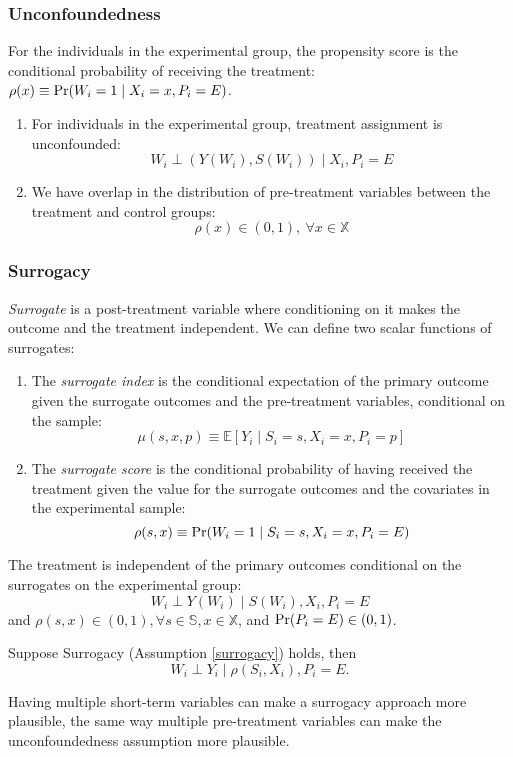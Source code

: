 \subsubsection*{Unconfoundedness}
For the individuals in the experimental group, the propensity score is the conditional probability of receiving the treatment: $\rho(x)\equiv \textnormal{Pr}(W_i=1\mid X_i=x,P_i=E)$.
\begin{assumption}\label{unconfounded}
\begin{enumerate}
    \item For individuals in the experimental group, treatment assignment is unconfounded: $$W_i\perp (Y(W_i), S(W_i))\mid X_i,P_i=E$$
    \item We have overlap in the distribution of pre-treatment variables between the treatment and control groups: $$\rho(x)\in (0,1),\ \forall x\in \mathbb{X}$$
\end{enumerate}
\end{assumption}

\subsubsection*{Surrogacy}
\textit{Surrogate} is a post-treatment variable where conditioning on it makes the outcome and the treatment independent. We can define two scalar functions of surrogates:
\begin{definition}
    \begin{enumerate}
        \item The \textit{surrogate index} is the conditional expectation of the primary outcome given the surrogate outcomes and the pre-treatment variables, conditional on the sample: $$\mu(s,x,p)\equiv \mathbb{E}[Y_i\mid S_i=s,X_i=x,P_i=p]$$
        \item The \textit{surrogate score} is the conditional probability of having received the treatment given the value for the surrogate outcomes and the covariates in the experimental sample: $$\rho(s,x)\equiv \textnormal{Pr}(W_i=1\mid S_i=s,X_i=x,P_i=E)$$
    \end{enumerate}
\end{definition}
\begin{assumption}[Surrogacy]\label{surrogacy}
    The treatment is independent of the primary outcomes conditional on the surrogates on the experimental group: $$W_i\perp Y(W_i)\mid S(W_i), X_i,P_i=E$$
    and $\rho(s,x)\in(0,1),\forall s\in \mathbb{S},x\in \mathbb{X}$, and $\textnormal{Pr}(P_i=E)\in (0,1)$.
\end{assumption}
\begin{proposition}
    Suppose Surrogacy (Assumption \ref{surrogacy}) holds, then $$W_i\perp Y_i\mid \rho(S_i,X_i), P_i=E.$$
\end{proposition}

\begin{note}
    Having multiple short-term variables can make a surrogacy approach more plausible, the same way multiple pre-treatment variables can make the unconfoundedness assumption more plausible.
\end{note}